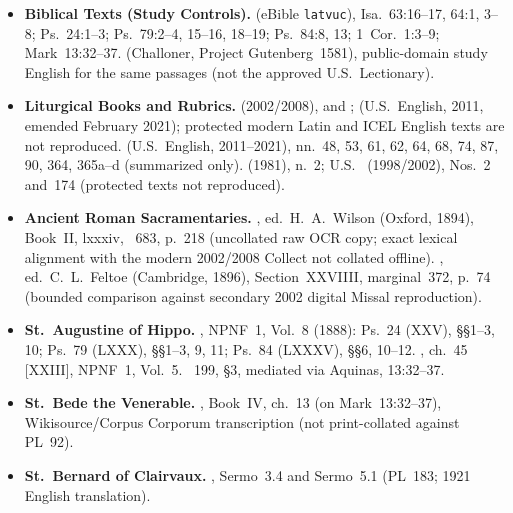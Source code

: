 \begin{itemize}[leftmargin=1.5em,itemsep=0.25em]

\item \textbf{Biblical Texts (Study Controls).}  (eBible \texttt{latvuc}), Isa.~63:16--17, 64:1, 3--8; Ps.~24:1--3; Ps.~79:2--4, 15--16, 18--19; Ps.~84:8, 13; 1~Cor.~1:3--9; Mark~13:32--37.  (Challoner, Project Gutenberg~1581), public-domain study English for the same passages (not the approved U.S.\ Lectionary).

\item \textbf{Liturgical Books and Rubrics.}  (2002/2008),  and ;  (U.S.\ English, 2011, emended February 2021); protected modern Latin and ICEL English texts are not reproduced.  (U.S.\ English, 2011--2021), nn.~48, 53, 61, 62, 64, 68, 74, 87, 90, 364, 365a--d (summarized only).  (1981), n.~2; U.S.\  (1998/2002), Nos.~2 and~174 (protected texts not reproduced).

\item \textbf{Ancient Roman Sacramentaries.} , ed.\ H.~A.\ Wilson (Oxford, 1894), Book~II, lxxxiv, ~683, p.~218 (uncollated raw OCR copy; exact lexical alignment with the modern 2002/2008 Collect not collated offline). , ed.\ C.~L.\ Feltoe (Cambridge, 1896), Section~XXVIIII, marginal~372, p.~74 (bounded comparison against secondary 2002 digital Missal reproduction).

\item \textbf{St.~Augustine of Hippo.} , NPNF~1, Vol.~8 (1888): Ps.~24 (XXV), §§1--3, 10; Ps.~79 (LXXX), §§1--3, 9, 11; Ps.~84 (LXXXV), §§6, 10--12. , ch.~45 [XXIII], NPNF~1, Vol.~5. ~199, §3, mediated via Aquinas,  13:32--37.

\item \textbf{St.~Bede the Venerable.} , Book~IV, ch.~13 (on Mark~13:32--37), Wikisource/Corpus Corporum transcription (not print-collated against PL~92).

\item \textbf{St.~Bernard of Clairvaux.} , Sermo~3.4 and Sermo~5.1 (PL~183; 1921 English translation).


\end{itemize}
